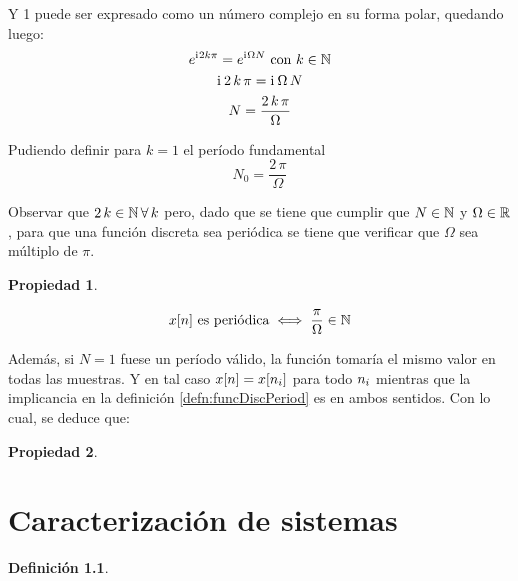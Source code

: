 \documentclass[a5paper,12pt,twoside]{book}
\newtheorem{defn}{{Definición}}[chapter]
\newtheorem{prop}{{Propiedad}}[chapter]
\begin{document}
Y 1 puede ser expresado como un número complejo en su forma polar, quedando luego:
\begin{gather*}
    e^{\mathrm{i}\mkern1mu 2 k \pi} = e^{\mathrm{i}\mkern1mu \Omega N} \text{ con $k \in \mathbb{N}$}
    \\
    \mathrm{i}\mkern1mu \, 2 \, k \, \pi = \mathrm{i}\mkern1mu \, \Omega \, N
    \\
    N = \frac{2 \, k \, \pi}{\Omega}
\end{gather*}

Pudiendo definir para $k=1$ el período fundamental
\begin{equation*}
    N_0 = \frac{2 \, \pi}{\Omega}
\end{equation*}

Observar que $2 \, k \in \mathbb{N} \, \forall \, k$ pero, dado que se tiene que cumplir que $N \in \mathbb{N}$ y $\Omega \in \mathbb{R}$, para que una función discreta sea periódica se tiene que verificar que $\Omega$ sea múltiplo de $\pi$.

\begin{mdframed}[style=MyFrame1]
    \begin{prop}
    \end{prop}
    \begin{equation*}
        x[n] \text{ es periódica} \iff \frac{\pi}{\Omega} \in \mathbb{N}
    \end{equation*}
\end{mdframed}

Además, si $N=1$ fuese un período válido, la función tomaría el mismo valor en todas las muestras. Y en tal caso $x[n] = x[n_i]$ para todo $n_i$ mientras que la implicancia en la definición \ref{defn:funcDiscPeriod} es en ambos sentidos. Con lo cual, se deduce que:

\begin{mdframed}[style=MyFrame1]
    \begin{prop}
    \end{prop}
\end{mdframed}


\chapter{Caracterización de sistemas}

\begin{mdframed}[style=MyFrame1]
    \begin{defn}
    \end{defn}
\end{mdframed}
\end{document}

